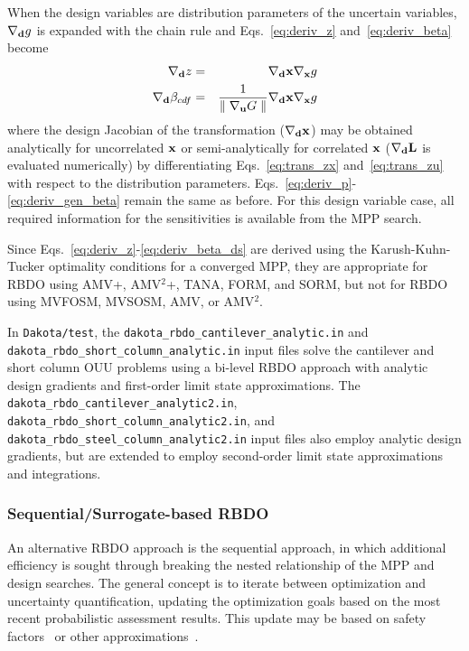 When the design variables are distribution parameters of the uncertain
variables, $\nabla_{\bf d} g$ is expanded with the chain rule and
Eqs.~\ref{eq:deriv_z} and~\ref{eq:deriv_beta} become
\begin{eqnarray}
\nabla_{\bf d} z           & = & \nabla_{\bf d} {\bf x} \nabla_{\bf x} g
\label{eq:deriv_z_ds} \\
\nabla_{\bf d} \beta_{cdf} & = & \frac{1}{{\parallel \nabla_{\bf u} G 
\parallel}} \nabla_{\bf d} {\bf x} \nabla_{\bf x} g \label{eq:deriv_beta_ds}
\end{eqnarray}
where the design Jacobian of the transformation ($\nabla_{\bf d} {\bf x}$)
may be obtained analytically for uncorrelated ${\bf x}$ or 
semi-analytically for correlated ${\bf x}$ ($\nabla_{\bf d} {\bf L}$
is evaluated numerically) by differentiating Eqs.~\ref{eq:trans_zx} 
and~\ref{eq:trans_zu} with respect to the distribution parameters.
Eqs.~\ref{eq:deriv_p}-\ref{eq:deriv_gen_beta} remain the same as
before.  For this design variable case, all required information for 
the sensitivities is available from the MPP search.

Since Eqs.~\ref{eq:deriv_z}-\ref{eq:deriv_beta_ds} are derived using
the Karush-Kuhn-Tucker optimality conditions for a converged MPP, they
are appropriate for RBDO using AMV+, AMV$^2$+, TANA, FORM, and SORM,
but not for RBDO using MVFOSM, MVSOSM, AMV, or AMV$^2$.

In \texttt{Dakota/test}, the
\texttt{dakota\_rbdo\_cantilever\_analytic.in} and\\
\texttt{dakota\_rbdo\_short\_column\_analytic.in} input files solve 
the cantilever and short column OUU problems using a bi-level RBDO
approach with analytic design gradients and first-order limit state
approximations.  The \texttt{dakota\_rbdo\_cantilever\_analytic2.in},
\texttt{dakota\_rbdo\_short\_column\_analytic2.in}, and 
\texttt{dakota\_rbdo\_steel\_column\_analytic2.in} input files 
also employ analytic design gradients, but are extended to employ
second-order limit state approximations and integrations.

\subsubsection{Sequential/Surrogate-based RBDO} \label{models:ex:ouu:surr_rbdo}

An alternative RBDO approach is the sequential approach, in which
additional efficiency is sought through breaking the nested
relationship of the MPP and design searches.  The general concept is
to iterate between optimization and uncertainty quantification,
updating the optimization goals based on the most recent probabilistic
assessment results.  This update may be based on safety
factors~\cite{Wu01} or other approximations~\cite{Du04}.

